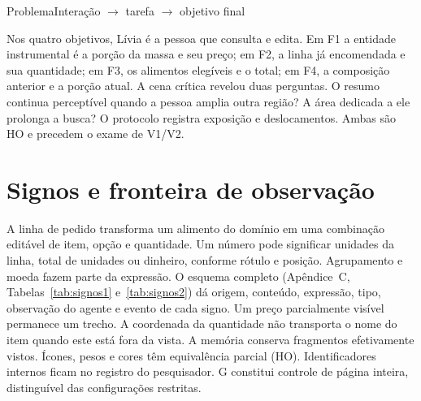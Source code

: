 \begin{uxtable}{Problema}{Interação $\rightarrow$ tarefa $\rightarrow$ objetivo final}
\end{uxtable}
\par Nos quatro objetivos, Lívia é a pessoa que consulta e edita. Em F1 a entidade instrumental é a porção da massa e seu preço; em F2, a linha já encomendada e sua quantidade; em F3, os alimentos elegíveis e o total; em F4, a composição anterior e a porção atual.
A cena crítica revelou duas perguntas. O resumo continua perceptível quando a pessoa amplia outra região? A área dedicada a ele prolonga a busca? O protocolo registra exposição e deslocamentos. Ambas são HO e precedem o exame de V1/V2.
\section{Signos e fronteira de observação}
A linha de pedido transforma um alimento do domínio em uma combinação editável de item, opção e quantidade. Um número pode significar unidades da linha, total de unidades ou dinheiro, conforme rótulo e posição. Agrupamento e moeda fazem parte da expressão. O esquema completo (Apêndice~C, Tabelas~\ref{tab:signos1} e~\ref{tab:signos2}) dá origem, conteúdo, expressão, tipo, observação do agente e evento de cada signo. Um preço parcialmente visível permanece um trecho. A coordenada da quantidade não transporta o nome do item quando este está fora da vista. A memória conserva fragmentos efetivamente vistos. Ícones, pesos e cores têm equivalência parcial (HO). Identificadores internos ficam no registro do pesquisador. G constitui controle de página inteira, distinguível das configurações restritas.

